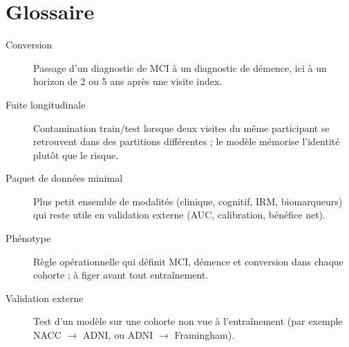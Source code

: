 \chapter*{Glossaire}

\begin{description}
\item[Conversion] Passage d'un diagnostic de MCI à un diagnostic de démence, ici à un horizon de 2 ou 5 ans après une visite index.
\item[Fuite longitudinale] Contamination train/test lorsque deux visites du même participant se retrouvent dans des partitions différentes ; le modèle mémorise l'identité plutôt que le risque.
\item[Paquet de données minimal] Plus petit ensemble de modalités (clinique, cognitif, IRM, biomarqueurs) qui reste utile en validation externe (AUC, calibration, bénéfice net).
\item[Phénotype] Règle opérationnelle qui définit MCI, démence et conversion dans chaque cohorte ; à figer avant tout entraînement.
\item[Validation externe] Test d'un modèle sur une cohorte non vue à l'entraînement (par exemple NACC $\rightarrow$ ADNI, ou ADNI $\rightarrow$ Framingham).
\end{description}
